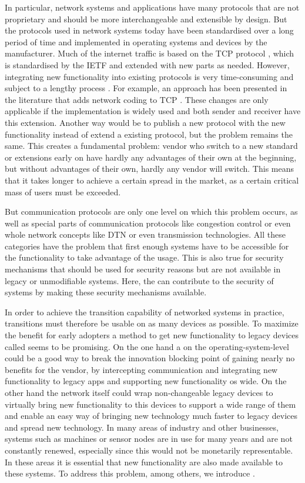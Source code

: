 In particular, network systems and applications have many protocols that are not proprietary and should be more interchangeable and extensible by design. 
But the protocols used in network systems today have been standardised over a long period of time and implemented in operating systems and devices by the manufacturer.
Much of the internet traffic is based on the TCP protocol \cite{A3:john2007analysis}, which is standardised by the IETF and extended with new parts as needed. 
However, integrating new functionality into existing protocols is very time-consuming and subject to a lengthy process \cite{A3:de2019pluginizing}. 
For example, an approach has been presented in the literature that adds network coding to TCP \cite{A3:sundararajan2011network}. 
These changes are only applicable if the implementation is widely used and both sender and receiver have this extension. 
Another way would be to publish a new protocol with the new functionality instead of extend a existing protocol, but the problem remains the same. 
This creates a fundamental problem: vendor who switch to a new standard or extensions early on have hardly any advantages of their own at the beginning, but without advantages of their own, hardly any vendor will switch.
This means that it takes longer to achieve a certain spread in the market, as a certain critical mass of users must be exceeded. 

But communication protocols are only one level on which this problem occurs, as well as special parts of communication protocols like congestion control or even whole network concepts like DTN or even transmission technologies. 
All these categories have the problem that first enough systems have to be accessible for the functionality to take advantage of the usage. 
This is also true for security mechanisms that should be used for security reasons but are not available in legacy or unmodifiable systems. 
Here, the \mm can contribute to the security of systems by making these security mechanisms available.

In order to achieve the transition capability of networked systems in practice, transitions must therefore be usable on as many devices as possible.
To maximize the benefit for early adopters a method to get new functionality to legacy devices called  \mm seems to be promising.
On the one hand a \mm on the operating-system-level could be a good way to break the innovation blocking point of gaining nearly no benefits for the vendor, by intercepting communication and integrating new functionality to legacy apps and supporting new functionality os wide.
On the other hand the network itself could wrap non-changeable legacy devices to virtually bring new functionality to this devices to support a wide range of them and enable an easy way of bringing new technology much faster to legacy devices and spread new technology. 
In many areas of industry and other businesses, systems such as machines or sensor nodes are in use for many years and are not constantly renewed, especially since this would not be monetarily representable.
In these areas it is essential that new functionality are also made available to these systems.
To address this problem, among others, we introduce \mm. 

